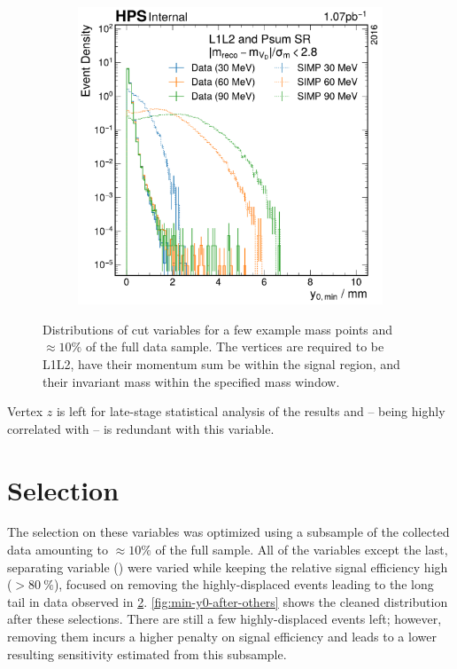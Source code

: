 \begin{figure}
\begin{subfigure}{0.30\textwidth}
    \caption{\maxyzeroerr}
    \label{fig:data-signal-comp:max-y0-err}
  \end{subfigure}
  ~
  \begin{subfigure}{0.30\textwidth}
    \includegraphics[width=\textwidth]{figures/hps/analysis/min_y0-distribution.pdf}
    \caption{\minyzero}
    \label{fig:data-signal-comp:min-y0}
  \end{subfigure}
  \caption{%
    Distributions of cut variables for a few example mass points and $\approx10\%$ of the full data sample.
    The vertices are required to be L1L2, have their momentum sum be within
    the signal region, and their invariant mass within the specified mass window.
  }
  \label{fig:data-signal-comp}
\end{figure}

Vertex $z$ is left for late-stage statistical analysis of the results
and -- being highly correlated with \minyzero -- is redundant with this variable.

\section{Selection}
The selection on these variables was optimized using a subsample of the collected
data amounting to $\approx10\%$ of the full sample.
All of the variables except the last, separating variable (\minyzero) were varied
while keeping the relative signal efficiency high ($>\qty{80}{\%}$), focused on
removing the highly-displaced events leading to the long tail in data observed
in \cref{fig:data-signal-comp:min-y0}.
\cref{fig:min-y0-after-others} shows the cleaned \minyzero distribution after
these selections.
There are still a few highly-displaced events left; however, removing them
incurs a higher penalty on signal efficiency and leads to a lower resulting
sensitivity estimated from this subsample.

